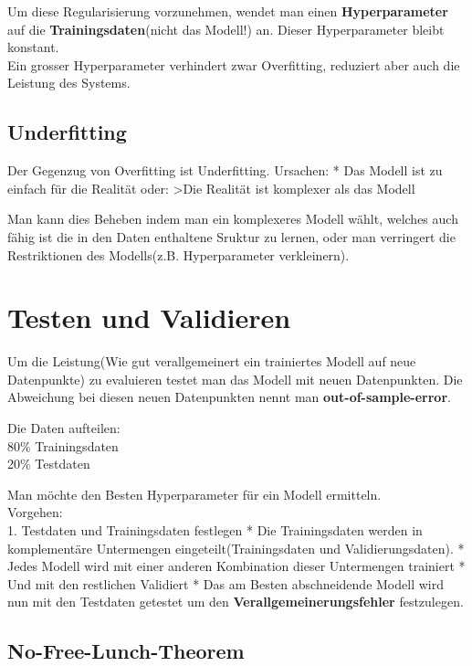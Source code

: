 \documentclass[11pt]{article}
\begin{document}
Um diese Regularisierung vorzunehmen, wendet man einen
\textbf{Hyperparameter} auf die \textbf{Trainingsdaten}(nicht das
Modell!) an. Dieser Hyperparameter bleibt konstant.\\
Ein grosser Hyperparameter verhindert zwar Overfitting, reduziert aber
auch die Leistung des Systems.

\subsection{Underfitting}\label{underfitting}

Der Gegenzug von Overfitting ist Underfitting. Ursachen: * Das Modell
ist zu einfach für die Realität oder: \textgreater{}Die Realität ist
komplexer als das Modell

Man kann dies Beheben indem man ein komplexeres Modell wählt, welches
auch fähig ist die in den Daten enthaltene Sruktur zu lernen, oder man
verringert die Restriktionen des Modells(z.B. Hyperparameter
verkleinern).

    \section{Testen und Validieren}\label{testen-und-validieren}

Um die Leistung(Wie gut verallgemeinert ein trainiertes Modell auf neue
Datenpunkte) zu evaluieren testet man das Modell mit neuen Datenpunkten.
Die Abweichung bei diesen neuen Datenpunkten nennt man
\textbf{out-of-sample-error}.

Die Daten aufteilen:\\
80\% Trainingsdaten\\
20\% Testdaten

Man möchte den Besten Hyperparameter für ein Modell ermitteln.\\
Vorgehen:\\
1. Testdaten und Trainingsdaten festlegen * Die Trainingsdaten werden in
komplementäre Untermengen eingeteilt(Trainingsdaten und
Validierungsdaten). * Jedes Modell wird mit einer anderen Kombination
dieser Untermengen trainiert * Und mit den restlichen Validiert * Das am
Besten abschneidende Modell wird nun mit den Testdaten getestet um den
\textbf{Verallgemeinerungsfehler} festzulegen.

\subsection{No-Free-Lunch-Theorem}\label{no-free-lunch-theorem}
\end{document}
